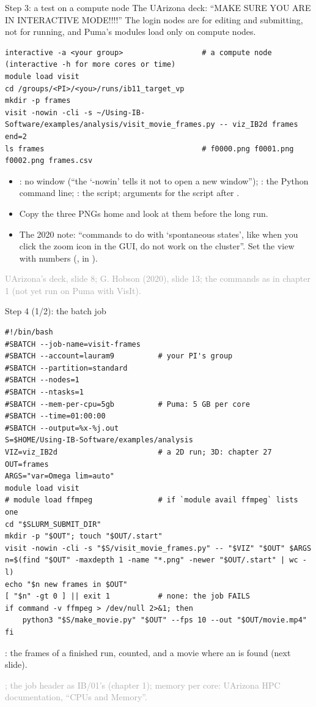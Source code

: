 \documentclass[aspectratio=169,11pt]{beamer}
\newcommand{\sourcecredit}[1]{\vfill\begin{flushright}\tiny\textcolor{DarkGray}{#1}\end{flushright}}
\begin{document}
\begin{frame}[fragile]{Step 3: a test on a compute node}
\label{fr:interactive}
\footnotesize
The UArizona deck: ``MAKE SURE YOU ARE IN INTERACTIVE MODE!!!!'' The login nodes are for editing and submitting, not for running, and Puma's modules load only on compute nodes.
\begin{lstlisting}[style=shell]
interactive -a <your group>                  # a compute node (interactive -h for more cores or time)
module load visit
cd /groups/<PI>/<you>/runs/ib11_target_vp
mkdir -p frames
visit -nowin -cli -s ~/Using-IB-Software/examples/analysis/visit_movie_frames.py -- viz_IB2d frames end=2
ls frames                                    # f0000.png f0001.png f0002.png frames.csv
\end{lstlisting}
\begin{itemize}\setlength{\itemsep}{1pt}
  \item {}: no window (``the `-nowin' tells it not to open a new window''); : the Python command line; : the script; arguments for the script after \code{--}.
  \item Copy the three PNGs home and look at them before the long run.
  \item The 2020 note: ``commands to do with `spontaneous states', like when you click the zoom icon in the GUI, do not work on the cluster''. Set the view with numbers (,  in ).
\end{itemize}
\sourcecredit{UArizona's deck, slide 8; G. Hobson (2020), slide 13; the commands as in chapter 1 (not yet run on Puma with VisIt).}
\end{frame}

\begin{frame}[fragile]{Step 4 (1/2): the batch job}
\label{fr:batch}
\begin{lstlisting}[style=shtiny]
#!/bin/bash
#SBATCH --job-name=visit-frames
#SBATCH --account=lauram9          # your PI's group
#SBATCH --partition=standard
#SBATCH --nodes=1
#SBATCH --ntasks=1
#SBATCH --mem-per-cpu=5gb          # Puma: 5 GB per core
#SBATCH --time=01:00:00
#SBATCH --output=%x-%j.out
S=$HOME/Using-IB-Software/examples/analysis
VIZ=viz_IB2d                       # a 2D run; 3D: chapter 27
OUT=frames
ARGS="var=Omega lim=auto"
module load visit
# module load ffmpeg               # if `module avail ffmpeg` lists one
cd "$SLURM_SUBMIT_DIR"
mkdir -p "$OUT"; touch "$OUT/.start"
visit -nowin -cli -s "$S/visit_movie_frames.py" -- "$VIZ" "$OUT" $ARGS
n=$(find "$OUT" -maxdepth 1 -name "*.png" -newer "$OUT/.start" | wc -l)
echo "$n new frames in $OUT"
[ "$n" -gt 0 ] || exit 1           # none: the job FAILS
if command -v ffmpeg > /dev/null 2>&1; then
    python3 "$S/make_movie.py" "$OUT" --fps 10 --out "$OUT/movie.mp4"
fi
\end{lstlisting}
\scriptsize {}: the frames of a finished run, counted, and a movie where an  is found (next slide).
\sourcecredit{; the job header as IB/01's \code{job.slurm} (chapter 1); memory per core: UArizona HPC documentation, ``CPUs and Memory''.}
\end{frame}
\end{document}
